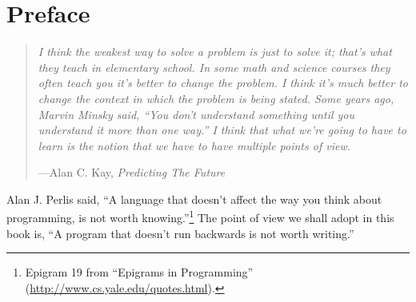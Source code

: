 \chapter{Preface}\label{sec:preface}

\vspace{-1cm}

\begin{quotation}
\noindent
\emph{I think the weakest way to solve a problem is just to solve it; that's what they teach in elementary school. In some math and science courses they often teach you it's better to change the problem. I think it's much better to change the context in which the problem is being stated. Some years ago, Marvin Minsky said, ``You don't understand something until you understand it more than one way.'' I think that what we're going to have to learn is the notion that we have to have multiple points of view.}
\begin{flushright}
\vspace{-0.5em}
---Alan C. Kay, \emph{Predicting The Future}
\end{flushright}
\end{quotation}


Alan J. Perlis said, ``A language that doesn't affect the way you think about programming, is not worth knowing.''\footnote{Epigram 19 from ``Epigrams in Programming'' (\url{http://www.cs.yale.edu/quotes.html}).}
%
The point of view we shall adopt in this book is, ``A program that doesn't run backwards is not worth writing.''

%




